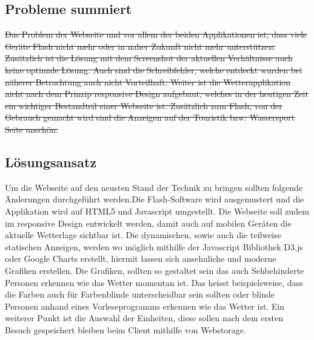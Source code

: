 \subsection{Probleme summiert}
\sout{Das Problem der Webseite und vor allem der beiden Applikationen ist, dass viele Geräte Flash nicht mehr oder in naher Zukunft nicht mehr unterstützen. Zusätzlich ist die Lösung mit dem Screenshot der aktuellen Verhältnisse auch keine optimale Lösung. Auch sind die Schreibfehler, welche entdeckt wurden bei näherer Betrachtung auch nicht Vorteilhaft. Weiter ist die Wetterapplikation nicht nach dem Prinzip responsive Design aufgebaut, welches in der heutigen Zeit ein wichtiger Bestandteil einer Webseite ist. Zusätzlich zum Flash, von der Gebrauch gemacht wird sind die Anzeigen auf der Touristik bzw. Wassersport Seite unschön. }


\subsection{Lösungsansatz}
Um die Webseite auf den neusten Stand der Technik zu bringen sollten folgende Änderungen durchgeführt werden.Die Flash-Software wird ausgemustert und die Applikation wird auf HTML5 und Javascript umgestellt. Die Webseite soll zudem im responsive Design entwickelt werden, damit auch auf mobilen Geräten die aktuelle Wetterlage sichtbar ist. Die dynamischen, sowie auch die teilweise statischen Anzeigen, werden wo möglich mithilfe der Javascript Bibliothek D3.js oder Google Charts erstellt, hiermit lassen sich ansehnliche und moderne Grafiken erstellen. Die Grafiken, sollten so gestaltet sein das auch Sehbehinderte Personen erkennen wie das Wetter momentan ist. Das heisst beispielsweise, dass die Farben auch für Farbenblinde unterscheidbar sein sollten oder blinde Personen anhand eines Vorleseprogramms erkennen wie das Wetter ist. Ein weiterer Punkt ist die Auswahl der Einheiten, diese sollen nach dem ersten Besuch gespeichert bleiben beim Client mithilfe von Webstorage.
